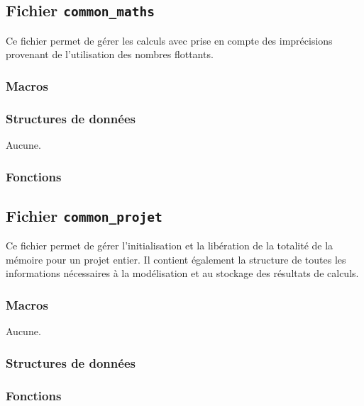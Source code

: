 \documentclass{article}
\begin{document}
\subsection{Fichier {\texttt{common\_maths}}}
Ce fichier permet de gérer les calculs avec prise en compte des imprécisions provenant de l'utilisation des nombres flottants.
\subsubsection{Macros}

\subsubsection{Structures de données}
Aucune.
\subsubsection{Fonctions}
\noindent\hrulefill






\subsection{Fichier {\texttt{common\_projet}}}
Ce fichier permet de gérer l'initialisation et la libération de la totalité de la mémoire pour un projet entier. Il contient également la structure de toutes les informations nécessaires à la modélisation et au stockage des résultats de calculs.
\subsubsection{Macros}
Aucune.
\subsubsection{Structures de données}







\subsubsection{Fonctions}
\noindent\hrulefill




\end{document}
